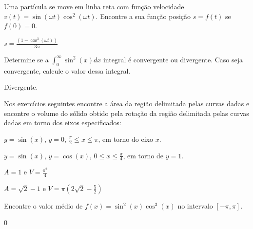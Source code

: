 \begin{exercises}
\begin{exercise}
Uma partícula se move em linha reta com função velocidade
$v(t)= \sin(\omega t) \cos^2(\omega t)$.
Encontre a sua função posição $s=f(t)$ se $f(0)=0$.
\begin{answer}
  $s=\frac{(1-\cos^3(\omega t))}{3\omega}$
\end{answer}
\end{exercise}

\begin{exercise}
Determine se a
\(\int_{0}^{\infty} \sin^2(x) dx\)
integral é convergente ou divergente.
Caso seja convergente, calcule o valor dessa integral.
\begin{answer}
Divergente.
\end{answer}

\end{exercise}
\begin{exercise}
Nos exercícios seguintes encontre a área da região delimitada pelas curvas
dadas e encontre o volume do sólido obtido pela rotação da região delimitada
pelas curvas dadas em torno dos eixos especificados:
\begin{alphalist}
    \item $y=\sin(x)$, $y=0$, \(\frac{\pi}{2} \leq x \leq \pi\), em torno do eixo $x$.
    \item $y=\sin(x)$, $y=\cos(x)$, \(0\leq x \leq \frac{\pi}{4}\), em torno de $y=1$.
\end{alphalist}
\begin{answer}
\begin{alphalist}
    \item $A=1$ e \(V=\frac{\pi^2}{4}\)
    \item $A=\sqrt{2}-1$ e \(V=\pi\left(2\sqrt{2}- \frac{5}{2}\right)\)
\end{alphalist}
\end{answer}
\end{exercise}

\begin{exercise}
Encontre o valor médio de $f(x)= \sin^2(x)\cos^3(x)$ no intervalo $[-\pi,\pi]$.
\begin{answer}
0
\end{answer}
\end{exercise}


\end{exercises}
